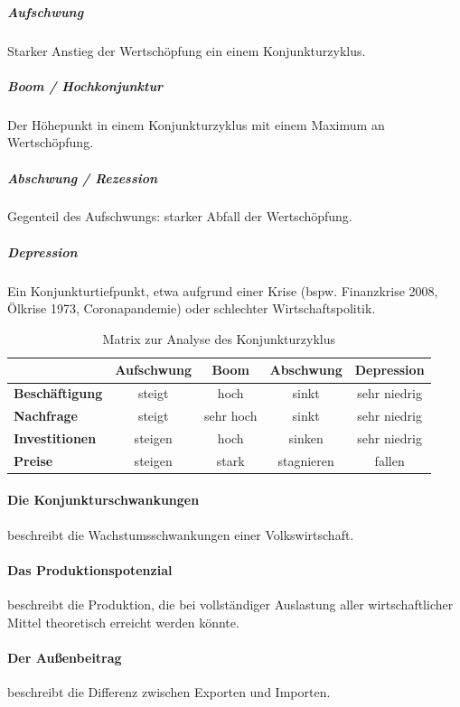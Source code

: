 \documentclass{article}
\begin{document}
	\subparagraph{Aufschwung}
	Starker Anstieg der Wertschöpfung ein einem Konjunkturzyklus.

	\subparagraph{Boom / Hochkonjunktur}
	Der Höhepunkt in einem Konjunkturzyklus mit einem Maximum an Wertschöpfung.

	\subparagraph{Abschwung / Rezession}
	Gegenteil des Aufschwungs: starker Abfall der Wertschöpfung.

	\subparagraph{Depression}
	Ein Konjunkturtiefpunkt, etwa aufgrund einer Krise (bspw. Finanzkrise 2008, Ölkrise 1973, Coronapandemie) oder schlechter Wirtschaftspolitik.

	\begin{table}[h]
		\centering
		\def\arraystretch{1.1}
		\begin{tabular}{|l|c|c|c|c|}
			\hline
			\textbf{} & \textbf{Aufschwung} & \textbf{Boom} & \textbf{Abschwung} & \textbf{Depression} \\
			\hline
			\hline
			\textbf{Beschäftigung} & steigt & hoch & sinkt & sehr niedrig \\
			\hline
			\textbf{Nachfrage} & steigt & sehr hoch & sinkt & sehr niedrig \\ 
			\hline
			\textbf{Investitionen} & steigen & hoch & sinken & sehr niedrig \\
			\hline
			\textbf{Preise} & steigen & stark & stagnieren & fallen \\
			\hline
		\end{tabular}
		\caption{Matrix zur Analyse des Konjunkturzyklus}
		\label{tab:konjunkturzyklus}
	\end{table}

	\paragraph{Die Konjunkturschwankungen}
	beschreibt die Wachstumsschwankungen einer Volkswirtschaft.

	\paragraph{Das Produktionspotenzial}
	beschreibt die Produktion, die bei vollständiger Auslastung aller wirtschaftlicher Mittel theoretisch erreicht werden könnte.

	\paragraph{Der Außenbeitrag}
	beschreibt die Differenz zwischen Exporten und Importen.
\end{document}
